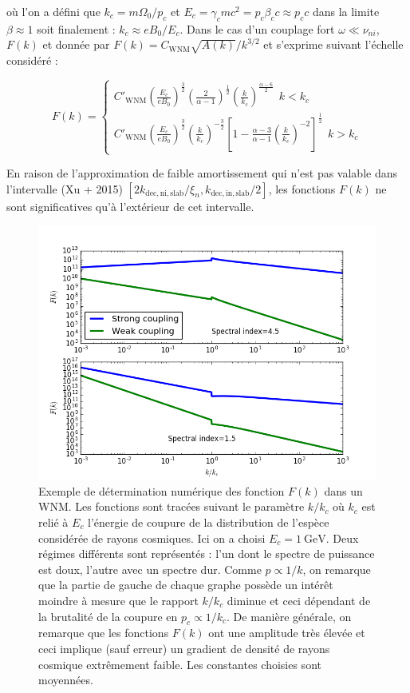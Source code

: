\documentclass[10pt,a4paper]{article}
\begin{document}
où l'on a défini que $k_c = m\Omega_0 / p_c$ et $E_c = \gamma_c m c^2 = p_c \beta_c c \approx p_c c$ dans la limite $\beta \approx 1$ soit finalement : $k_c \approx eB_0 / E_c$. Dans le cas d'un couplage fort $\omega \ll \nu_{ni}$, $F(k)$ et donnée par $F(k) = C_\mathrm{WNM}\sqrt{A(k)}/k^{3/2}$ et s'exprime suivant l'échelle considéré : 

\begin{equation}
F(k) = \left\{
\begin{array}{rl}
  C'_\mathrm{WNM} \left( \frac{E_c}{eB_0} \right)^{\frac{3}{2}} \left( \frac{2}{\alpha - 1} \right)^{\frac{1}{2}} \left( \frac{k}{k_c} \right)^{\frac{\alpha - 6}{2}}   ~~ k < k_c \\
  C'_\mathrm{WNM} \left( \frac{E_c}{eB_0} \right)^{\frac{3}{2}} \left( \frac{k}{k_c} \right)^{-\frac{3}{2}} \left [ 1 - \frac{\alpha - 3}{\alpha - 1} \left( \frac{k}{k_c} \right)^{-2} \right]^{\frac{1}{2}}~~ k > k_c 
\end{array}
\right.
\end{equation}

En raison de l'approximation de faible amortissement qui n'est pas valable dans l'intervalle (Xu + 2015) $\left[ 2 k_\mathrm{dec,ni,slab} / \xi_n, k_\mathrm{dec,in,slab}/2 \right]$, les fonctions $F(k)$ ne sont significatives qu'à l'extérieur de cet intervalle. \\ 

\begin{figure}[h]
	\centering 
	\includegraphics[scale=0.5]{wnm_f(x).png}
	\caption{Exemple de détermination numérique des fonction $F(k)$ dans un WNM. Les fonctions sont tracées suivant le paramètre $k/k_c$ où $k_c$ est relié à $E_c$ l'énergie de coupure de la distribution de l'espèce considérée de rayons cosmiques. Ici on a choisi $E_c = 1~\mathrm{GeV}$. Deux régimes différents sont représentés : l'un dont le spectre de puissance est doux, l'autre avec un spectre dur. Comme $p \propto 1/k$, on remarque que la partie de gauche de chaque graphe possède un intérêt moindre à mesure que le rapport $k/k_c$ diminue et ceci dépendant de la brutalité de la coupure en $p_c \propto 1/k_c$. De manière générale, on remarque que les fonctions $F(k)$ ont une amplitude très élevée et ceci implique (sauf erreur) un gradient de densité de rayons cosmique extrêmement faible. Les constantes choisies sont moyennées.}
\end{figure}
\end{document}
